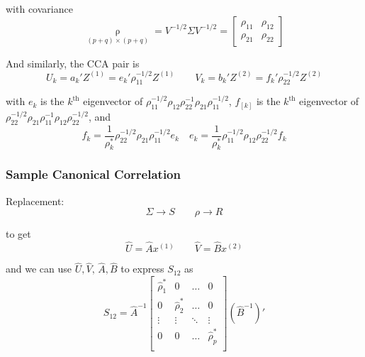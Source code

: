     with covariance
    \begin{equation}
        \mathop{\rho  }\limits_{(p+q)\times (p+q)}=V^{-1/2}\Sigma V^{-1/2}=\begin{bmatrix}
            \rho _{11}&\rho _{12}\\
            \rho _{21}&\rho _{22}
        \end{bmatrix}
    \end{equation}

    And similarly, the CCA pair is
    \begin{equation}
        U_k=a_k'Z^{(1)}=e_k'\rho _{11}^{-1/2}Z^{(1)}\qquad V_{k}=b_k'Z^{(2)}=f_k'\rho _{22}^{-1/2}Z^{(2)}
    \end{equation}
    
    with $ e_k $ is the $ k^\mathrm{th} $ eigenvector of $ \rho _11 ^{-1/2}\rho _{12}\rho _{22}^{-1}\rho_{21}\rho _{11}^{-1/2} $, $ f_[k] $ is the $ k^\mathrm{th} $ eigenvector of $ \rho _{22}^{-1/2}\rho _{21}\rho _{11}^{-1}\rho _{12}\rho _{22}^{-1/2} $, and
    \begin{equation}
        f_k=\dfrac{1}{\rho ^*_k}\rho _{22}^{-1/2}\rho _{21}\rho _{11}^{-1/2}e_k\quad e_k=\dfrac{1}{\rho _k^*}\rho _{11}^{-1/2}\rho _{12}\rho _{22}^{-1/2}f_k
    \end{equation}
    
    
\subsubsection{Sample Canonical Correlation}
    Replacement:
    \begin{equation}
        \Sigma \longrightarrow S\qquad \rho \longrightarrow R 
    \end{equation}
    
    to get 
    \begin{equation}
        \hat{U}=\hat{A}x^{(1)}\qquad \hat{V}=\hat{B}x^{(2)} 
    \end{equation}

    and we can use $ \hat{U},\hat{V},\, \hat{A},\hat{B} $ to express $ S_{12} $ as
    \begin{equation}
        S_{12}=\hat{A}^{-1}\begin{bmatrix}
        \hat{\rho }^*_{1}&0&\ldots&0\\
        0&\hat{\rho }^*_{2}&\ldots&0\\
        \vdots&\vdots&\ddots&\vdots\\
        0&0&\ldots&\hat{\rho }^*_{p}\\
        \end{bmatrix}(\hat{B}^{-1})'
    \end{equation}
    
